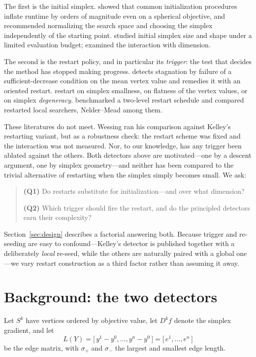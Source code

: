 \documentclass[11pt,a4paper]{article}
\begin{document}
The first is the initial simplex. \citet{wessing2019} showed that common
initialization procedures inflate runtime by orders of magnitude even on a
spherical objective, and recommended normalizing the search space and choosing
the simplex independently of the starting point. \citet{takenaga2023} studied
initial simplex size and shape under a limited evaluation budget;
\citet{han2006} examined the interaction with dimension.

The second is the restart policy, and in particular its \emph{trigger}: the test
that decides the method has stopped making progress. \citet{kelley1999} detects
stagnation by failure of a sufficient-decrease condition on the mean vertex
value and remedies it with an oriented restart. \citet{luersen2004} restart on
simplex smallness, on flatness of the vertex values, or on simplex
\emph{degeneracy}. \citet{hansen2009nm} benchmarked a two-level restart schedule
and \citet{posik2012} compared restarted local searchers, Nelder--Mead among
them.

These literatures do not meet. Wessing ran his comparison against Kelley's
restarting variant, but as a robustness check: the restart scheme was fixed and
the interaction was not measured. Nor, to our knowledge, has any trigger been
ablated against the others. Both detectors above are motivated---one by a
descent argument, one by simplex geometry---and neither has been compared to the
trivial alternative of restarting when the simplex simply becomes small. We ask:

\begin{quote}
\textbf{(Q1)} Do restarts substitute for initialization---and over what
dimension?

\textbf{(Q2)} Which trigger should fire the restart, and do the principled
detectors earn their complexity?
\end{quote}

Section~\ref{sec:design} describes a factorial answering both. Because trigger
and re-seeding are easy to confound---Kelley's detector is published together
with a deliberately \emph{local} re-seed, while the others are naturally paired
with a global one---we vary restart construction as a third factor rather than
assuming it away.

\section{Background: the two detectors}
\label{sec:background}

Let $S^k$ have vertices ordered by objective value, let $D^k f$ denote the
simplex gradient, and let
\[
  L(Y) = \bigl[\, y^1-y^0,\dots,y^n-y^0 \,\bigr] = \bigl[\,e^1,\dots,e^n\,\bigr]
\]
be the edge matrix, with $\sigma_+$ and $\sigma_-$ the largest and smallest edge
length.
\end{document}
